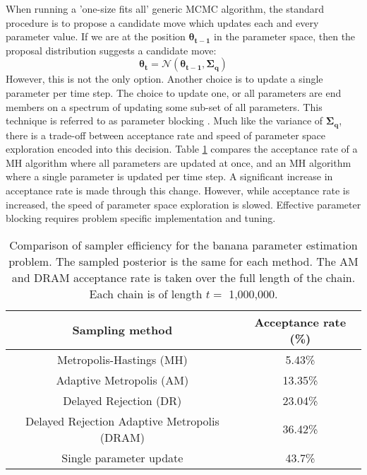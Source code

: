 When running a 'one-size fits all' generic MCMC algorithm, the standard procedure is to propose a candidate move which updates each and every parameter value. If we are at the position $\bm{\theta_{t-1}}$ in the parameter space, then the proposal distribution suggests a candidate move:
\begin{equation}
	\bm{\theta_{t}} = \mathcal{N}(\bm{\theta_{t-1}},\bm{\Sigma_q})
\end{equation}
However, this is not the only option. Another choice is to update a single parameter per time step. The choice to update one, or all parameters are end members on a spectrum of updating some sub-set of all parameters. This technique is referred to as parameter blocking \citep{Roberts1997,Sargent2000}. Much like the variance of $\bm{\Sigma_q}$, there is a trade-off between acceptance rate and speed of parameter space exploration encoded into this decision. Table \ref{sampling-method-comparison} compares the acceptance rate of a MH algorithm where all parameters are updated at once, and an MH algorithm where a single parameter is updated per time step. A significant increase in acceptance rate is made through this change. However, while acceptance rate is increased, the speed of parameter space exploration is slowed. Effective parameter blocking requires problem specific implementation and tuning. 

\begin{table}[H]
	\centering
	\begin{tabular}{|c|c|}
	\hline
	Sampling method & Acceptance rate (\%) \\
	\hline
	Metropolis-Hastings (MH) & 5.43\% \\
	\hline
	Adaptive Metropolis (AM) & 13.35\% \\
	\hline
	Delayed Rejection (DR) & 23.04\% \\
	\hline
	Delayed Rejection Adaptive Metropolis (DRAM) & 36.42\% \\
	\hline
	Single parameter update & 43.7\% \\
	\hline
	\end{tabular}
	\caption{Comparison of sampler efficiency for the banana parameter estimation problem. The sampled posterior is the same for each method. The AM and DRAM acceptance rate is taken over the full length of the chain. Each chain is of length $t = $ 1,000,000.}
	\label{sampling-method-comparison}
\end{table}


